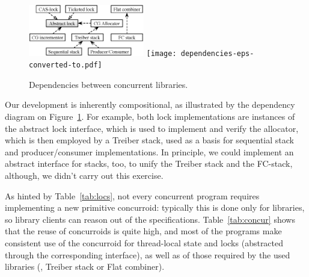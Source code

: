 {
\setlength{\belowcaptionskip}{-10pt}  
\begin{figure}[t!]
\centering
\ifdefined\psflag
    \includegraphics[width=0.45\textwidth]{dependencies.eps}
\else 
    \texttt{[image: dependencies-eps-converted-to.pdf]}
\fi
\caption{Dependencies between concurrent libraries.}
\label{fig:deps}
\end{figure}
}
%
Our development is inherently compositional, as illustrated by the
dependency diagram on Figure~\ref{fig:deps}. For example, both lock
implementations are instances of the abstract lock interface,
%
%
which is used to implement and verify the allocator, which is then
employed by a Treiber stack, used as a basis for sequential stack
and producer/consumer implementations. In principle, we could
implement an abstract interface for stacks, too, to unify the Treiber
stack and the FC-stack, although, we didn't carry out this exercise.

As hinted by Table~\ref{tab:locs}, not every concurrent program
requires implementing a new primitive concurroid: typically this is
done only for libraries, so library clients can reason out of the
specifications.  Table~\ref{tab:concur} shows that the reuse of
concurroids is quite high, and most of the programs make consistent
use of the concurroid for thread-local state and locks (abstracted
through the corresponding interface), as well as of those required by
the used libraries (\eg, Treiber stack or Flat combiner).
%
